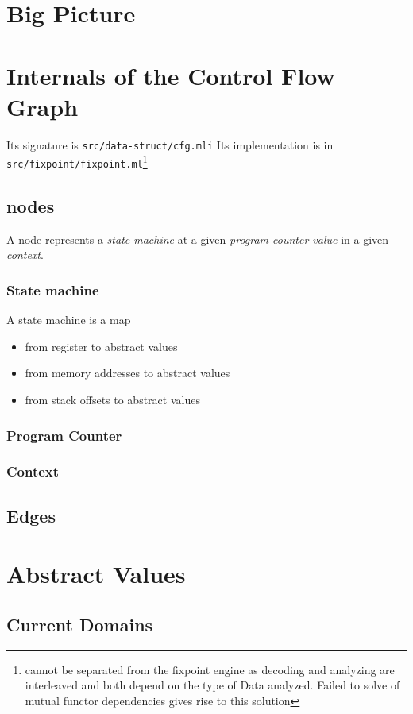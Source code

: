 \documentclass{report}
\begin{document}
\chapter{Big Picture}

\chapter{Internals of the Control Flow Graph}
Its signature is \verb|src/data-struct/cfg.mli|
Its implementation is in \verb|src/fixpoint/fixpoint.ml|\footnote{cannot be
separated from the fixpoint engine
as decoding and analyzing are interleaved and both depend on the type
of Data analyzed. Failed to solve of mutual functor dependencies gives
rise to this solution}

\section{nodes}
A node represents a \emph{state machine} at a given \emph{program counter value} 
in a given \emph{context}.
\subsection{State machine}
A state machine is a map 
\begin{itemize}
\item from register to abstract values
\item from memory addresses to abstract values
\item from stack offsets to abstract values

\end{itemize}
\subsection{Program Counter}
\subsection{Context}
\section{Edges}
\chapter{Abstract Values}
\section{Current Domains}
\end{document}
